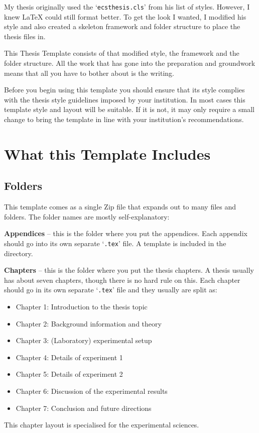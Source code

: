 My thesis originally used the `\texttt{ecsthesis.cls}' from his list of styles. However, I knew \LaTeX{} could still format better. To get the look I wanted, I modified his style and also created a skeleton framework and folder structure to place the thesis files in.

This Thesis Template consists of that modified style, the framework and the folder structure. All the work that has gone into the preparation and groundwork means that all you have to bother about is the writing.

Before you begin using this template you should ensure that its style complies with the thesis style guidelines imposed by your institution. In most cases this template style and layout will be suitable. If it is not, it may only require a small change to bring the template in line with your institution's recommendations.


\section{What this Template Includes}

\subsection{Folders}

This template comes as a single Zip file that expands out to many files and folders. The folder names are mostly self-explanatory:

\textbf{Appendices} -- this is the folder where you put the appendices. Each appendix should go into its own separate `\texttt{.tex}' file. A template is included in the directory.

\textbf{Chapters} -- this is the folder where you put the thesis chapters. A thesis usually has about seven chapters, though there is no hard rule on this. Each chapter should go in its own separate `\texttt{.tex}' file and they usually are split as:
\begin{itemize}
\item Chapter 1: Introduction to the thesis topic
\item Chapter 2: Background information and theory
\item Chapter 3: (Laboratory) experimental setup
\item Chapter 4: Details of experiment 1
\item Chapter 5: Details of experiment 2
\item Chapter 6: Discussion of the experimental results
\item Chapter 7: Conclusion and future directions
\end{itemize}
This chapter layout is specialised for the experimental sciences.

